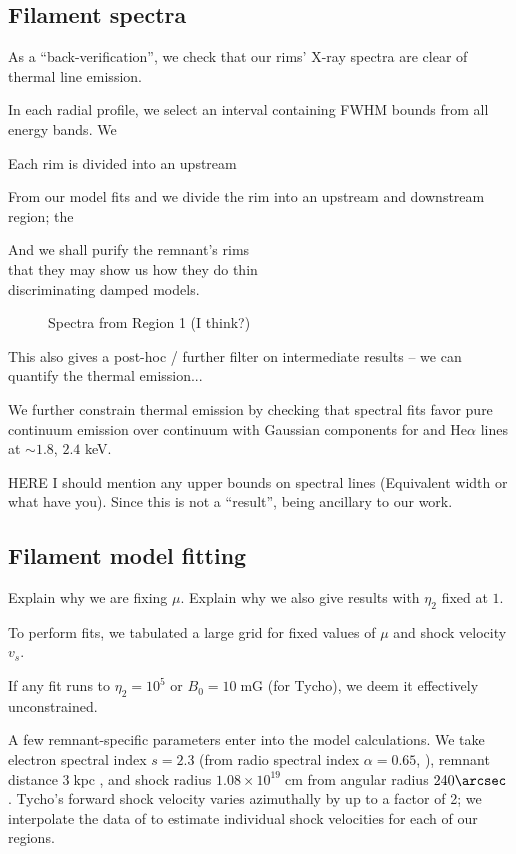 \documentclass[manuscript]{aastex}  %
\newcommand{\mt}{\mathrm}
\newcommand{\unit}[1]{\;\mt{#1}}  %
\newcommand{\abt}{\mathord{\sim}} %
\begin{document}
\subsection{Filament spectra}

As a ``back-verification'', we check that our rims' X-ray spectra
are clear of thermal line emission.

In each radial profile, we select an interval containing FWHM bounds from all
energy bands.  We 

Each rim is divided into an upstream

From our model fits and we divide the rim into an upstream and downstream region;
the 

And we shall purify the remnant's rims\\
that they may show us how they do thin\\
discriminating damped models.

\begin{figure}
    \caption{Spectra from Region 1 (I think?)}
    \label{fig:spec}
\end{figure}

This also gives a post-hoc / further filter on intermediate results --
we can quantify the thermal emission...

We further constrain thermal emission by checking that spectral fits
favor pure continuum emission over continuum with Gaussian components for
 and  He$\alpha$ lines at $\abt 1.8$, $2.4$ keV.

HERE I should mention any upper bounds on spectral lines (Equivalent width or
what have you).  Since this is not a ``result'', being ancillary to our work.

\subsection{Filament model fitting}

Explain why we are fixing $\mu$.
Explain why we also give results with $\eta_2$ fixed at $1$.

To perform fits, we tabulated a large grid for fixed values of $\mu$ and shock
velocity $v_s$.

If any fit runs to $\eta_2 = 10^5$ or $B_0 = 10 \unit{mG}$ (for Tycho),
we deem it effectively unconstrained.


A few remnant-specific parameters enter into the model calculations.  We take
electron spectral index $s = 2.3$ (from radio spectral index $\alpha = 0.65$,
\citet{kothes2006} ),
remnant distance $3 \unit{kpc}$ \citep[cf.][]{hayato2010}, and
shock radius $1.08 \times 10^{19} \unit{cm}$ from angular radius $240\arcsec$
\citep{green2009}.  Tycho's forward shock velocity varies azimuthally by up to
a factor of 2; we interpolate the data of \citet{williams2013} to estimate
individual shock velocities for each of our regions.
\end{document}

